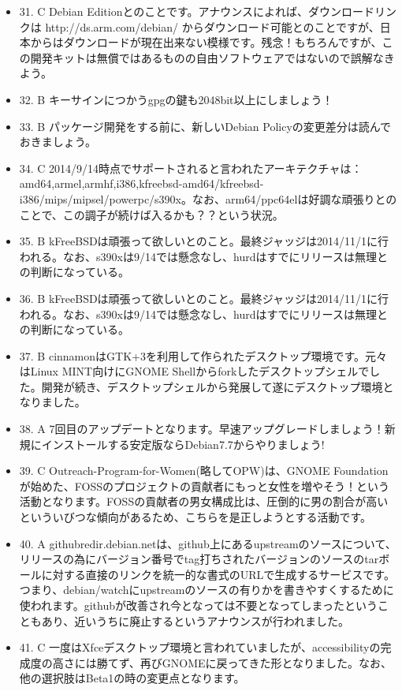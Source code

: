 \documentclass[mingoth,a4paper]{jsarticle}
\begin{document}
\begin{itemize}
\item
31. C Debian Editionとのことです。アナウンスによれば、ダウンロードリンクは http://ds.arm.com/debian/ からダウンロード可能とのことですが、日本からはダウンロードが現在出来ない模様です。残念！もちろんですが、この開発キットは無償ではあるものの自由ソフトウェアではないので誤解なきよう。
\item
32. B キーサインにつかうgpgの鍵も2048bit以上にしましょう！
\item
33. B パッケージ開発をする前に、新しいDebian Policyの変更差分は読んでおきましょう。
\item
34. C 2014/9/14時点でサポートされると言われたアーキテクチャは：amd64,armel,armhf,i386,kfreebsd-amd64/kfreebsd-i386/mips/mipsel/powerpc/s390x。なお、arm64/ppc64elは好調な頑張りとのことで、この調子が続けば入るかも？？という状況。
\item
35. B kFreeBSDは頑張って欲しいとのこと。最終ジャッジは2014/11/1に行われる。なお、s390xは9/14では懸念なし、hurdはすでにリリースは無理との判断になっている。
\item
36. B kFreeBSDは頑張って欲しいとのこと。最終ジャッジは2014/11/1に行われる。なお、s390xは9/14では懸念なし、hurdはすでにリリースは無理との判断になっている。
\item
37. B cinnamonはGTK+3を利用して作られたデスクトップ環境です。元々はLinux MINT向けにGNOME Shellからforkしたデスクトップシェルでした。開発が続き、デスクトップシェルから発展して遂にデスクトップ環境となりました。
\item
38. A 7回目のアップデートとなります。早速アップグレードしましょう！新規にインストールする安定版ならDebian7.7からやりましょう!
\item
39. C Outreach-Program-for-Women(略してOPW)は、GNOME Foundationが始めた、FOSSのプロジェクトの貢献者にもっと女性を増やそう！という活動となります。FOSSの貢献者の男女構成比は、圧倒的に男の割合が高いといういびつな傾向があるため、こちらを是正しようとする活動です。
\item
40. A githubredir.debian.netは、github上にあるupstreamのソースについて、リリースの為にバージョン番号でtag打ちされたバージョンのソースのtarボールに対する直接のリンクを統一的な書式のURLで生成するサービスです。つまり、debian/watchにupstreamのソースの有りかを書きやすくするために使われます。githubが改善され今となっては不要となってしまったということもあり、近いうちに廃止するというアナウンスが行われました。
\item
41. C 一度はXfceデスクトップ環境と言われていましたが、accessibilityの完成度の高さには勝てず、再びGNOMEに戻ってきた形となりました。なお、他の選択肢はBeta1の時の変更点となります。

\end{itemize}
\end{document}
